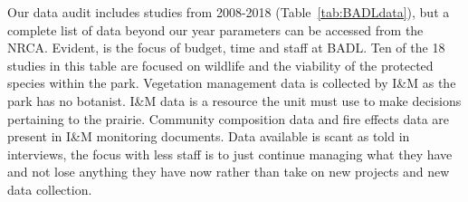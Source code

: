 Our data audit includes studies from 2008-2018 (Table~\ref{tab:BADLdata}), but a complete list of data beyond our year parameters can be accessed from the NRCA. 
Evident, is the focus of budget, time and staff at BADL. 
Ten of the 18 studies in this table are focused on wildlife and the viability of the protected species within the park.
Vegetation management data is collected by I\&M as the park has no botanist. 
I\&M data is a resource the unit must use to make decisions pertaining to the prairie. 
Community composition data and fire effects data are present in I\&M monitoring documents. 
Data available is scant as told in interviews, the focus with less staff is to just continue managing what they have and not lose anything they have now rather than take on new projects and new data collection.

{}
\recalctypearea
\pagestyle{plain}
\setlength{} 
\setlength\LTleft{0pt}           
